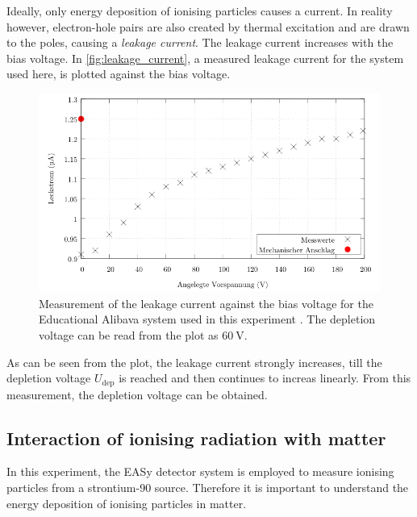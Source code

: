 Ideally, only energy deposition of ionising particles causes a current. In reality however, electron-hole pairs are also created by thermal excitation and are drawn to the poles,
causing a \textit{leakage current}. The leakage current increases with the bias voltage. In \autoref{fig:leakage_current}, a measured leakage current for the system used here,
is plotted against the bias voltage. 
\begin{figure}
    \centering 
    \includegraphics[width = .75\textwidth]{content/pics/leakage_current.png}
    \caption{Measurement of the leakage current against the bias voltage for the Educational Alibava system used in this experiment \cite{SiliconStrip}. 
    The depletion voltage can be read from the plot as $\qty{60}{\volt}$.}
    \label{fig:leakage_current}
\end{figure}
As can be seen from the plot, the leakage current strongly increases, till the depletion voltage $U_\text{dep}$ is reached and then continues to increas linearly.
From this measurement, the depletion voltage can be obtained.

\subsection{Interaction of ionising radiation with matter}
In this experiment, the EASy detector system is employed to measure ionising particles from a strontium-90 source. 
Therefore it is important to understand the energy deposition of ionising particles in matter.

